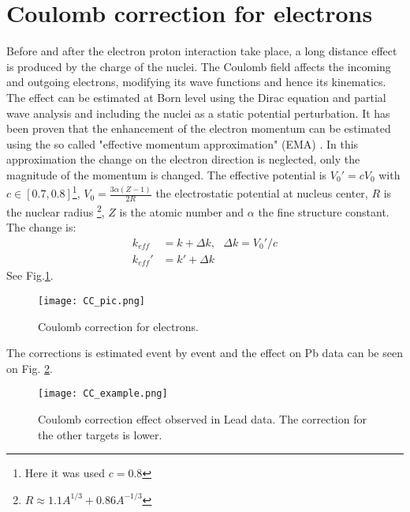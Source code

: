 \section{Coulomb correction for electrons}
Before and after the electron proton interaction take place, a long distance effect is produced by the charge of the nuclei. The Coulomb field affects the incoming and outgoing electrons, modifying its wave functions and hence its kinematics. The effect can be estimated at Born level using the Dirac equation and partial wave analysis and including the nuclei as a static potential perturbation. 
It has been proven that the enhancement of the electron momentum can be estimated using the so called "effective momentum approximation" (EMA) \cite{CC_2008}. In this approximation the change on the electron direction is neglected, only the magnitude of the momentum is changed. The effective potential is $V_0' = cV_0$ with $c \in [0.7,0.8]$\footnote{Here it was used $c=0.8$}, $V_0 = \frac{3\alpha(Z-1)}{2R}$ the electrostatic potential at nucleus center, $R$ is the nuclear radius \footnote{$R\approx 1.1A^{1/3} + 0.86A^{-1/3}$}, $Z$ is the atomic number and $\alpha$ the fine structure constant. The change is:
\begin{align}
k_{eff} &= k+\Delta k,~~~\Delta k = V_0'/c\\
k_{eff}'&= k'+\Delta k
\label{eq:CC}
\end{align}
See Fig.\ref{fig:CC_pic}.
\begin{figure}[!ht]
\centering
\texttt{[image: CC\_pic.png]}
\caption{Coulomb correction for electrons.}
\label{fig:CC_pic}
\end{figure}
The corrections is estimated event by event and the effect on Pb data can be seen on Fig. \ref{fig:CC_pic_example}.
%
\begin{figure}[!ht]
\centering
\texttt{[image: CC\_example.png]}
\caption{Coulomb correction effect observed in Lead data. The correction for the other targets is lower.}
\label{fig:CC_pic_example}
\end{figure}
\clearpage

